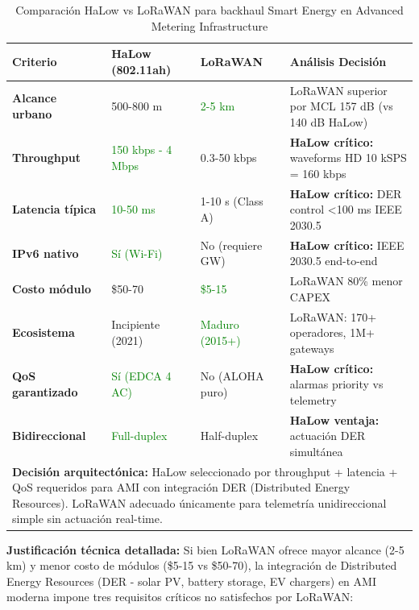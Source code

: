\begin{table}[h]
\centering
\small
\caption{Comparación HaLow vs LoRaWAN para backhaul Smart Energy en Advanced Metering Infrastructure}
\label{tab:halow-vs-lorawan}
\begin{tabular}{|p{2.8cm}|p{2.5cm}|p{2.5cm}|p{5cm}|}
\hline
\rowcolor{gray!20}
\textbf{Criterio} & \textbf{HaLow (802.11ah)} & \textbf{LoRaWAN} & \textbf{Análisis Decisión} \\
\hline
\textbf{Alcance urbano} & 500-800 m & \textcolor{green}{2-5 km} & LoRaWAN superior por MCL 157 dB (vs 140 dB HaLow) \\
\hline
\textbf{Throughput} & \textcolor{green}{150 kbps - 4 Mbps} & 0.3-50 kbps & \textbf{HaLow crítico:} waveforms HD 10 kSPS = 160 kbps \\
\hline
\textbf{Latencia típica} & \textcolor{green}{10-50 ms} & 1-10 s (Class A) & \textbf{HaLow crítico:} DER control <100 ms IEEE 2030.5 \\
\hline
\textbf{IPv6 nativo} & \textcolor{green}{Sí (Wi-Fi)} & No (requiere GW) & \textbf{HaLow crítico:} IEEE 2030.5 end-to-end \\
\hline
\textbf{Costo módulo} & \$50-70 & \textcolor{green}{\$5-15} & LoRaWAN 80\% menor CAPEX \\
\hline
\textbf{Ecosistema} & Incipiente (2021) & \textcolor{green}{Maduro (2015+)} & LoRaWAN: 170+ operadores, 1M+ gateways \\
\hline
\textbf{QoS garantizado} & \textcolor{green}{Sí (EDCA 4 AC)} & No (ALOHA puro) & \textbf{HaLow crítico:} alarmas priority vs telemetry \\
\hline
\textbf{Bidireccional} & \textcolor{green}{Full-duplex} & Half-duplex & \textbf{HaLow ventaja:} actuación DER simultánea \\
\hline
\multicolumn{4}{|p{14.5cm}|}{\textbf{Decisión arquitectónica:} HaLow seleccionado por throughput + latencia + QoS requeridos para AMI con integración DER (Distributed Energy Resources). LoRaWAN adecuado únicamente para telemetría unidireccional simple sin actuación real-time.} \\
\hline
\end{tabular}
\end{table}

\textbf{Justificación técnica detallada:} Si bien LoRaWAN ofrece mayor alcance (2-5 km) y menor costo de módulos (\$5-15 vs \$50-70), la integración de Distributed Energy Resources (DER - solar PV, battery storage, EV chargers) en AMI moderna impone tres requisitos críticos no satisfechos por LoRaWAN:

